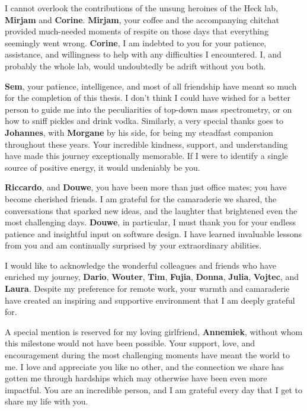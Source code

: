 I cannot overlook the contributions of the unsung heroines of the Heck lab, \textbf{Mirjam} and \textbf{Corine}. \textbf{Mirjam}, your coffee and the accompanying chitchat provided much-needed moments of respite on those days that everything seemingly went wrong. \textbf{Corine}, I am indebted to you for your patience, assistance, and willingness to help with any difficulties I encountered. I, and probably the whole lab, would undoubtedly be adrift without you both.

\textbf{Sem}, your patience, intelligence, and most of all friendship have meant so much for the completion of this thesis. I don't think I could have wished for a better person to guide me into the peculiarities of top-down mass spectrometry, or on how to sniff pickles and drink vodka. Similarly, a very special thanks goes to \textbf{Johannes}, with \textbf{Morgane} by his side, for being my steadfast companion throughout these years. Your incredible kindness, support, and understanding have made this journey exceptionally memorable. If I were to identify a single source of positive energy, it would undeniably be you.

\textbf{Riccardo}, and \textbf{Douwe}, you have been more than just office mates; you have become cherished friends. I am grateful for the camaraderie we shared, the conversations that sparked new ideas, and the laughter that brightened even the most challenging days. \textbf{Douwe}, in particular, I must thank you for your endless patience and insightful input on software design. I have learned invaluable lessons from you and am continually surprised by your extraordinary abilities.

I would like to acknowledge the wonderful colleagues and friends who have enriched my journey, \textbf{Dario}, \textbf{Wouter}, \textbf{Tim}, \textbf{Fujia}, \textbf{Donna}, \textbf{Julia}, \textbf{Vojtec}, and \textbf{Laura}. Despite my preference for remote work, your warmth and camaraderie have created an inspiring and supportive environment that I am deeply grateful for.

A special mention is reserved for my loving girlfriend, \textbf{Annemiek}, without whom this milestone would not have been possible. Your support, love, and encouragement during the most challenging moments have meant the world to me. I love and appreciate you like no other, and the connection we share has gotten me through hardships which may otherwise have been even more impactful. You are an incredible person, and I am grateful every day that I get to share my life with you.

